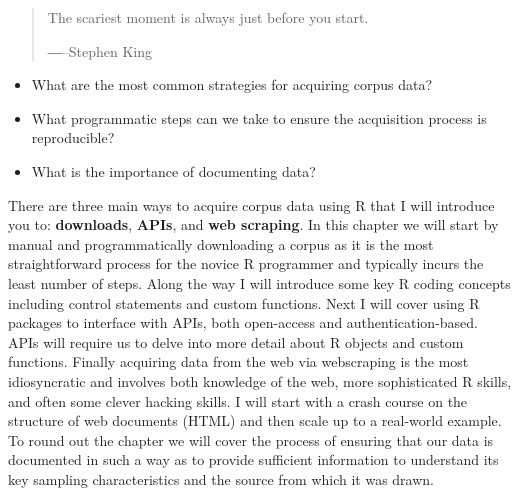\documentclass[
  letterpaper,
]{latex/krantz}
\providecommand{\tightlist}{%
  \setlength{\itemsep}{0pt}\setlength{\parskip}{0pt}}\usepackage{longtable,booktabs,array}
\begin{document}
\begin{quote}
The scariest moment is always just before you start.

―--Stephen King
\end{quote}

\begin{tcolorbox}[enhanced jigsaw, opacitybacktitle=0.6, breakable, colframe=quarto-callout-note-color-frame, arc=.35mm, left=2mm, leftrule=.75mm, title=\textcolor{quarto-callout-note-color}{\faInfo}\hspace{0.5em}{Keys}, opacityback=0, colback=white, toptitle=1mm, rightrule=.15mm, titlerule=0mm, bottomtitle=1mm, bottomrule=.15mm, coltitle=black, colbacktitle=quarto-callout-note-color!10!white, toprule=.15mm]

\begin{itemize}
\tightlist
\item
  What are the most common strategies for acquiring corpus data?
\item
  What programmatic steps can we take to ensure the acquisition process
  is reproducible?
\item
  What is the importance of documenting data?
\end{itemize}

\end{tcolorbox}

There are three main ways to acquire corpus data using R that I will
introduce you to: \textbf{downloads}, \textbf{APIs}, and \textbf{web
scraping}. In this chapter we will start by manual and programmatically
downloading a corpus as it is the most straightforward process for the
novice R programmer and typically incurs the least number of steps.
Along the way I will introduce some key R coding concepts including
control statements and custom functions. Next I will cover using R
packages to interface with APIs, both open-access and
authentication-based. APIs will require us to delve into more detail
about R objects and custom functions. Finally acquiring data from the
web via webscraping is the most idiosyncratic and involves both
knowledge of the web, more sophisticated R skills, and often some clever
hacking skills. I will start with a crash course on the structure of web
documents (HTML) and then scale up to a real-world example. To round out
the chapter we will cover the process of ensuring that our data is
documented in such a way as to provide sufficient information to
understand its key sampling characteristics and the source from which it
was drawn.
\end{document}
